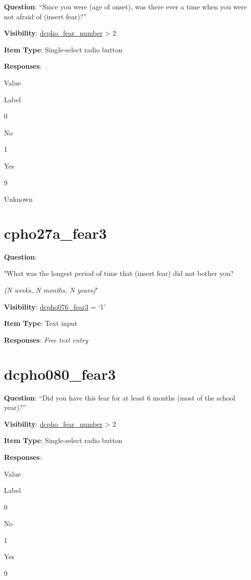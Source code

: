 \documentclass[]{book}
\begin{document}
\textbf{Question}: ``Since you were (age of onset), was there ever a time when you were not afraid of (insert fear)?''

\textbf{Visibility}: \protect\hyperlink{dcpho_fear_number}{dcpho\_fear\_number} \textgreater{} 2

\textbf{Item Type}: Single-select radio button

\textbf{Responses}:

Value

Label

0

No

1

Yes

9

Unknown

\hypertarget{cpho27a_fear3}{%
\section{cpho27a\_fear3}\label{cpho27a_fear3}}

\textbf{Question}:

"What was the longest period of time that (insert fear) did not bother you?

\emph{(N weeks, N months, N years)}"

\textbf{Visibility}: \protect\hyperlink{dcpho076_fear3}{dcpho076\_fear3} = `1'

\textbf{Item Type}: Text input

\textbf{Responses}: \emph{Free text entry}

\hypertarget{dcpho080_fear3}{%
\section{dcpho080\_fear3}\label{dcpho080_fear3}}

\textbf{Question}: ``Did you have this fear for at least 6 months (most of the school year)?''

\textbf{Visibility}: \protect\hyperlink{dcpho_fear_number}{dcpho\_fear\_number} \textgreater{} 2

\textbf{Item Type}: Single-select radio button

\textbf{Responses}:

Value

Label

0

No

1

Yes

9
\end{document}
